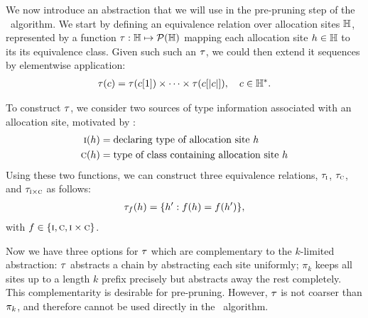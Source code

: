 
We now introduce an abstraction that we will use in the pre-pruning step of the \PR\ algorithm.
We start by defining an equivalence relation over allocation sites ${\mathbb H}$,
represented by a function $\tau : {\mathbb H} \mapsto \mathcal{P}({\mathbb H})$
mapping each allocation site $h \in {\mathbb H}$ to its its equivalence class.
Given such such an $\tau$, we could then extend it sequences by elementwise application:
\begin{align}
\tau(c) = \tau(c[1]) \times \cdots \times \tau(c[|c|]), \quad c \in {\mathbb H}^*.
\end{align}

To construct $\tau$, we consider two sources of type information associated
with an allocation site, motivated by \cite{smaragdakis11context}:
\begin{align}
\text{\sc i}(h)  &= \text{declaring type of allocation site $h$} \label{eqn:typeIs} \\
\text{\sc c}(h) &= \text{type of class containing allocation site $h$} \label{eqn:typeHas}
\end{align}
Using these two functions, we can construct three equivalence relations,
$\tau_{\text{\sc i}}$, $\tau_{\text{\sc c}}$, and $\tau_{\text{\sc i} \times \text{\sc c}}$ as follows:
\begin{align}
\tau_f(h) = \{ h' : f(h) = f(h') \}, \label{eqn:hclass}
\end{align}
with $f \in \{ \text{\sc i}, \text{\sc c}, \text{\sc i} \times \text{\sc c} \}$.

Now we have three options for $\tau$ which are complementary to the
$k$-limited abstraction: $\tau$ abstracts a chain by abstracting each site
uniformly; $\pi_k$ keeps all sites up to a length $k$ prefix precisely but
abstracts away the rest completely.  This complementarity is desirable
for pre-pruning.
However, $\tau$ is not coarser than $\pi_k$, and therefore cannot
be used directly in the \PR\ algorithm.

